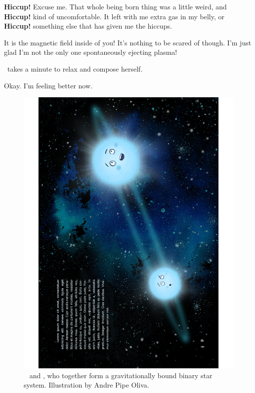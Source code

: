 \documentclass[main.tex]{subfiles}
\begin{document}
\par \Merope \textbf{Hiccup!}  Excuse me.  That whole being born thing was a little weird, and \textbf{Hiccup!} kind of uncomfortable.  It left with me extra gas in my belly, or \textbf{Hiccup!} something else that has given me the hiccups.  

\par \Alcyone It is the magnetic field inside of you!  It's nothing to be scared of though.  I'm just glad I'm not the only one spontaneously ejecting plasma!

\par \nar \rmmerope~takes a minute to relax and compose herself.

\par \Merope Okay.  I'm feeling better now.  

\begin{figure}
\includegraphics[width=\columnwidth,angle=270,origin=c]{ch1_1.pdf}
\caption{\rmmaia~ and \rmmerope, who together form a gravitationally bound binary star system.  Illustration by Andre Pipe Oliva. 
\label{fig:fig1}}
\end{figure}
\end{document}
